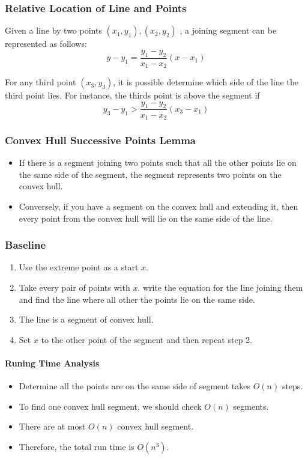 \documentclass[en,hazy,blue,screen,14pt]{elegantnote}
\begin{document}
\subsubsection{Relative Location of Line and Points}
Given a line by two points $(x_1, y_1), (x_2, y_2)$ , a joining segment can 
be represented as follows:
\[y - y_1 = \frac{y_1 - y_2}{x_1 - x_2} (x - x_1)\]

For any third point $(x_3, y_3)$, it is possible determine which side of the 
line the third point lies. For instance, the thirds point is above the segment 
if 
\[y_3 - y_1 > \frac{y_1 - y_2}{x_1 - x_2} (x_3 - x_1)\]

\subsubsection{Convex Hull Successive Points Lemma}
\begin{itemize}
 \item If there is a segment joining two points such that all the other 
points lie on the same side of the segment, the segment represents two points 
on the convex hull.
 \item Conversely, if you have a segment on the convex hull and extending it, 
then every point from the convex hull will lie on the same side of the line.
\end{itemize}

\subsubsection{Baseline}
\begin{enumerate}
\item Use the extreme point as a start $x$.
\item Take every pair of points with $x$. write the equation for the line 
joining them and find the line where all other the points lie on the same side.
\item The line is a segment of convex hull.
\item Set $x$ to the other point of the segment and then repeat step 2.
\end{enumerate}

\paragraph{Runing Time Analysis}
\begin{itemize}
\item Determine all the points are on the same side of segment takes $O(n)$ 
steps.
\item To find one convex hull segment, we should check $O(n)$ segments.
\item There are at most $O(n)$ convex hull segment.
\item Therefore, the total run time is $O(n^3)$.
\end{itemize}
\end{document}
